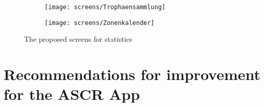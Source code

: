 \begin{figure}[h]
	\centering
	\begin{subfigure}[b]{0.24\columnwidth}
		\centering
		\texttt{[image: screens/Trophaensammlung]}
		\label{fig:trophaen}
	\end{subfigure}
	\begin{subfigure}[b]{0.24\columnwidth}
		\centering
		\texttt{[image: screens/Zonenkalender]}
		\label{fig:zonen:optimizer}
	\end{subfigure}
	\caption{The proposed screens for statistics}
	\label{fig:kalender-} %
\end{figure}


\section{Recommendations for improvement for the ASCR App}

